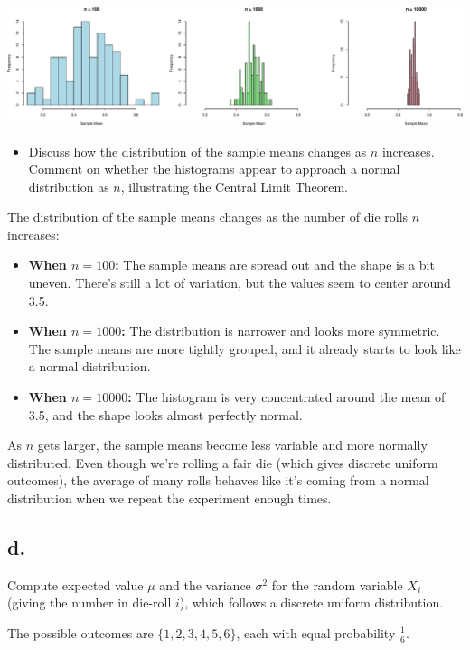 \documentclass[
]{article}
\providecommand{\tightlist}{%
  \setlength{\itemsep}{0pt}\setlength{\parskip}{0pt}}
\begin{document}
\includegraphics{CS1_files/figure-latex/unnamed-chunk-18-1.pdf}

\begin{itemize}
\tightlist
\item
  Discuss how the distribution of the sample means changes as \(n\)
  increases. Comment on whether the histograms appear to approach a
  normal distribution as \(n\), illustrating the Central Limit Theorem.
\end{itemize}

The distribution of the sample means changes as the number of die rolls
\(n\) increases:

\begin{itemize}
\item
  \textbf{When \(n = 100\):} The sample means are spread out and the
  shape is a bit uneven. There's still a lot of variation, but the
  values seem to center around 3.5.
\item
  \textbf{When \(n = 1000\):} The distribution is narrower and looks
  more symmetric. The sample means are more tightly grouped, and it
  already starts to look like a normal distribution.
\item
  \textbf{When \(n = 10000\):} The histogram is very concentrated around
  the mean of 3.5, and the shape looks almost perfectly normal.
\end{itemize}

As \(n\) gets larger, the sample means become less variable and more
normally distributed. Even though we're rolling a fair die (which gives
discrete uniform outcomes), the average of many rolls behaves like it's
coming from a normal distribution when we repeat the experiment enough
times.

\subsection{d.~}\label{d.-2}

Compute expected value \(\mu\) and the variance \(\sigma^2\) for the
random variable \(X_i\) (giving the number in die-roll \(i\)), which
follows a discrete uniform distribution.

The possible outcomes are \(\{1, 2, 3, 4, 5, 6\}\), each with equal
probability \(\frac{1}{6}\).
\end{document}
